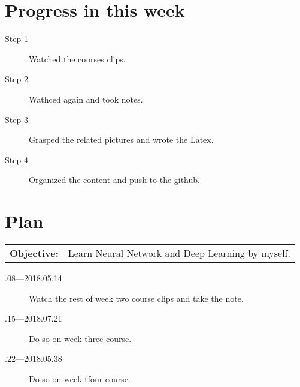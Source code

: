 \documentclass[a4paper]{article}
\begin{document}
\section{Progress in this week}

\begin{description}
\item [Step 1]
Watched the courses clips.
\item[Step 2]
Wathced again and took notes.
\item[Step 3]
Grasped the related pictures and wrote the Latex.
\item[Step 4]
Organized the content and push to the github.
\end{description}


\section{Plan}

\begin{tabular}{rl}
	\textbf{Objective:} & Learn Neural Network and Deep Learning by myself. \\
\end{tabular}

\begin{description}
    \item[.08---2018.05.14] Watch the rest of week two course clips and take the note.
    \item[.15---2018.07.21] Do so on week three course.
    \item[.22---2018.05.38] Do so on week tfour course.
\end{description}



\end{document}
